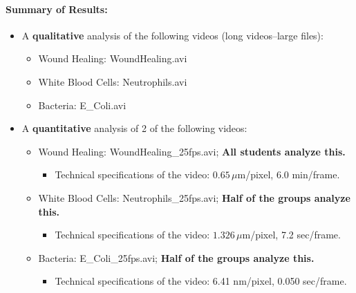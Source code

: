 \paragraph{ Summary of Results:}
\begin{itemize}
\item A \textbf{qualitative} analysis of the following videos (long videos--large files):
	\begin{itemize}
	\item Wound Healing: WoundHealing.avi
	\item White Blood Cells: Neutrophils.avi
	\item Bacteria: E\_Coli.avi
	\end{itemize}
\item A \textbf{quantitative} analysis of 2 of the following videos:
	\begin{itemize}
	\item Wound Healing: WoundHealing\_25fps.avi; \textbf{All students analyze this.}
		\begin{itemize}
		\item Technical specifications of the video: $0.65 \, \mu$m/pixel, 6.0 min/frame.
		\end{itemize}
	\item White Blood Cells: Neutrophils\_25fps.avi; \textbf{Half of the groups analyze this.}
		\begin{itemize}
		\item Technical specifications of the video: $1.326 \, \mu$m/pixel, 7.2 sec/frame.
		\end{itemize}
	\item Bacteria: E\_Coli\_25fps.avi; \textbf{Half of the groups analyze this.}
		\begin{itemize}
		\item Technical specifications of the video: 6.41 nm/pixel, 0.050 sec/frame.
		\end{itemize}
	\end{itemize}
\end{itemize}

